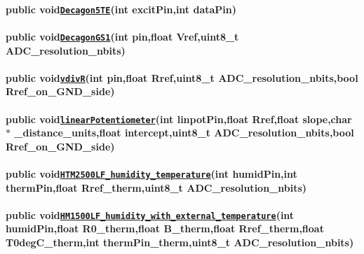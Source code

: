 \paragraph*{{\ttfamily public void}\href{#classLogger_1a40ae372dee7f672a6d6f33ab441e4da1}{\tt {\ttfamily Decagon5\+TE}}{\ttfamily (int excit\+Pin,int data\+Pin)}}

\paragraph*{{\ttfamily public void}\href{#classLogger_1a84da6a9ec3d4d56fdc32d950b71f1a26}{\tt {\ttfamily Decagon\+G\+S1}}{\ttfamily (int pin,float Vref,uint8\+\_\+t A\+D\+C\+\_\+resolution\+\_\+nbits)}}

\paragraph*{{\ttfamily public void}\href{#classLogger_1ab1ae31b2bdb77c86fb6851907258171b}{\tt {\ttfamily vdivR}}{\ttfamily (int pin,float Rref,uint8\+\_\+t A\+D\+C\+\_\+resolution\+\_\+nbits,bool Rref\+\_\+on\+\_\+\+G\+N\+D\+\_\+side)}}

\paragraph*{{\ttfamily public void}\href{#classLogger_1a95670d06ec3b68300895cd7bf8c37999}{\tt {\ttfamily linear\+Potentiometer}}{\ttfamily (int linpot\+Pin,float Rref,float slope,char $\ast$ \+\_\+distance\+\_\+units,float intercept,uint8\+\_\+t A\+D\+C\+\_\+resolution\+\_\+nbits,bool Rref\+\_\+on\+\_\+\+G\+N\+D\+\_\+side)}}

\paragraph*{{\ttfamily public void}\href{#classLogger_1a4ccff7a14a6bddc8bb28e22b3b36d3cc}{\tt {\ttfamily H\+T\+M2500\+L\+F\+\_\+humidity\+\_\+temperature}}{\ttfamily (int humid\+Pin,int therm\+Pin,float Rref\+\_\+therm,uint8\+\_\+t A\+D\+C\+\_\+resolution\+\_\+nbits)}}

\paragraph*{{\ttfamily public void}\href{#classLogger_1a62b74ddb3cf9fdd7dae2394c1b245ed4}{\tt {\ttfamily H\+M1500\+L\+F\+\_\+humidity\+\_\+with\+\_\+external\+\_\+temperature}}{\ttfamily (int humid\+Pin,float R0\+\_\+therm,float B\+\_\+therm,float Rref\+\_\+therm,float T0deg\+C\+\_\+therm,int therm\+Pin\+\_\+therm,uint8\+\_\+t A\+D\+C\+\_\+resolution\+\_\+nbits)}}

